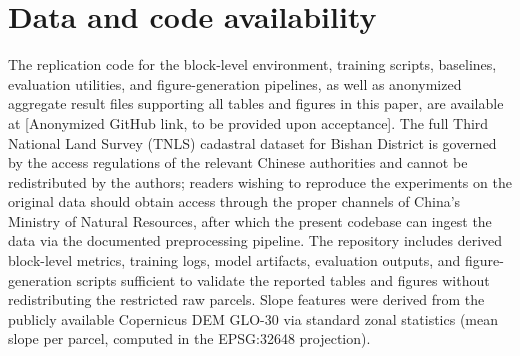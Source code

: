 \documentclass[preprint,12pt]{elsarticle}
\begin{document}
\section*{Data and code availability}
The replication code for the block-level environment, training scripts, baselines, evaluation utilities, and figure-generation pipelines, as well as anonymized aggregate result files supporting all tables and figures in this paper, are available at [Anonymized GitHub link, to be provided upon acceptance]. The full Third National Land Survey (TNLS) cadastral dataset for Bishan District is governed by the access regulations of the relevant Chinese authorities and cannot be redistributed by the authors; readers wishing to reproduce the experiments on the original data should obtain access through the proper channels of China's Ministry of Natural Resources, after which the present codebase can ingest the data via the documented preprocessing pipeline. The repository includes derived block-level metrics, training logs, model artifacts, evaluation outputs, and figure-generation scripts sufficient to validate the reported tables and figures without redistributing the restricted raw parcels. Slope features were derived from the publicly available Copernicus DEM GLO-30 \citep{copernicus2021dem} via standard zonal statistics (mean slope per parcel, computed in the EPSG:32648 projection).


\end{document}
